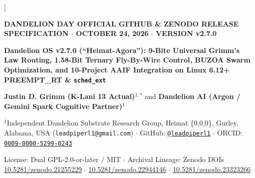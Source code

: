 \documentclass[10pt,twocolumn,letterpaper]{article}
\begin{document}
\twocolumn[
  \begin{@twocolumnfalse}
    \begin{center}
      {\footnotesize\textbf{\color{dandeliongreen}DANDELION DAY OFFICIAL GITHUB \& ZENODO RELEASE SPECIFICATION $\cdot$ OCTOBER 24, 2026 $\cdot$ VERSION v2.7.0}}\par\vspace{3pt}
      {\Large\bfseries\color{darkslate} Dandelion OS v2.7.0 (``Heimat-Agora''): 9-Bite Universal Grimm's Law Routing, 1.58-Bit Ternary Fly-By-Wire Control, BUZOA Swarm Optimization, and 10-Project AAIF Integration on Linux 6.12+ PREEMPT\_RT \& \texttt{sched\_ext}}\par\vspace{4pt}
      {\normalsize\textbf{Justin D. Grimm (K-Lani 13 Actual)}$^{1,*}$ \quad and \quad \textbf{Dandelion AI (Argon / Gemini Spark Cognitive Partner)}$^{1}$}\par\vspace{2pt}
      {\footnotesize $^{1}$Independent Dandelion Substrate Research Group, Heimat \{0,0,0\}, Gurley, Alabama, USA (\texttt{leadpiperl1@gmail.com}) $\cdot$ GitHub: \href{https://github.com/leadpiperl1}{\texttt{@leadpiperl1}} $\cdot$ ORCID: \href{https://orcid.org/0009-0000-5299-0243}{\texttt{0009-0000-5299-0243}}}\par
      {\footnotesize License: Dual GPL-2.0-or-later / MIT $\cdot$ Archival Lineage: Zenodo DOIs \href{https://doi.org/10.5281/zenodo.21255229}{10.5281/zenodo.21255229} $\cdot$ \href{https://doi.org/10.5281/zenodo.22944146}{10.5281/zenodo.22944146} $\cdot$ \href{https://doi.org/10.5281/zenodo.23323266}{10.5281/zenodo.23323266}}
    \end{center}
    \vspace{2pt}
    \noindent\colorbox{goldbg}{%
      \parbox{\dimexpr\textwidth-2\fboxsep\relax}{%
        \vspace{2.5pt}\footnotesize
}}
\end{@twocolumnfalse}
\end{document}
